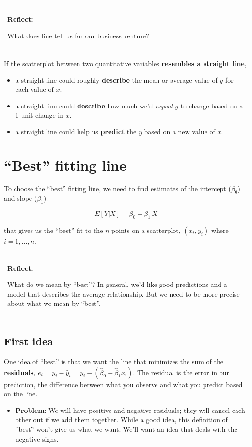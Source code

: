 \documentclass[
]{book}
\providecommand{\tightlist}{%
  \setlength{\itemsep}{0pt}\setlength{\parskip}{0pt}}
\newenvironment{reflect}
{
    \begin{center}
    
    \begin{tabular}{|p{0.8\textwidth}|}
    \rowcolor{LightBlue}
    \hline\\
    \rowcolor{LightBlue}
    \textbf{Reflect:}
}
{
    \\\rowcolor{LightBlue}
    \\\hline
    \end{tabular} 
    \end{center}
}
\begin{document}
\begin{reflect}
What does line tell us for our business venture?
\end{reflect}

If the scatterplot between two quantitative variables \textbf{resembles a straight line},

\begin{itemize}
\tightlist
\item
  a straight line could roughly \textbf{describe} the mean or average value of \(y\) for each value of \(x\).
\item
  a straight line could \textbf{describe} how much we'd \emph{expect} \(y\) to change based on a 1 unit change in \(x\).
\item
  a straight line could help us \textbf{predict} the \(y\) based on a new value of \(x\).
\end{itemize}

\hypertarget{best-fitting-line}{%
\section{``Best'' fitting line}\label{best-fitting-line}}

To choose the ``best'' fitting line, we need to find estimates of the intercept (\(\beta_0\)) and slope (\(\beta_1\)),

\[ E[Y | X] =  \beta_0 + \beta_1\,X \]

that gives us the ``best'' fit to the \(n\) points on a scatterplot, \((x_i,y_i)\) where \(i=1,...,n\).

\begin{reflect}
What do we mean by ``best''? In general, we'd like good predictions and
a model that describes the average relationship. But we need to be more
precise about what we mean by ``best''.
\end{reflect}

\hypertarget{first-idea}{%
\subsection{First idea}\label{first-idea}}

One idea of ``best'' is that we want the line that minimizes the sum of the \textbf{residuals}, \(e_i = y_i - \hat{y}_i = y_i - ( \hat{\beta}_0 + \hat{\beta}_1x_i)\). The residual is the error in our prediction, the difference between what you observe and what you predict based on the line.

\begin{itemize}
\tightlist
\item
  \textbf{Problem}: We will have positive and negative residuals; they will cancel each other out if we add them together. While a good idea, this definition of ``best'' won't give us what we want. We'll want an idea that deals with the negative signs.
\end{itemize}
\end{document}
